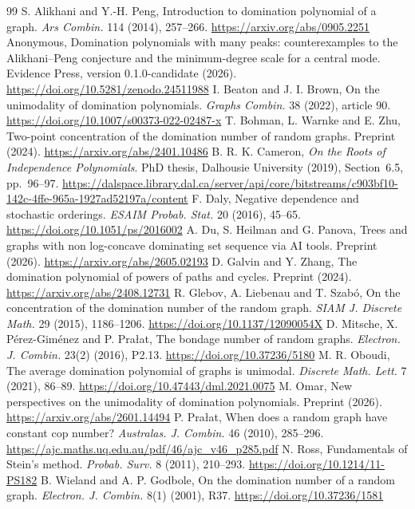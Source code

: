 \documentclass[11pt]{article}
\theoremstyle{remark}
\begin{document}
\begin{thebibliography}{99}
 S. Alikhani and Y.-H. Peng, Introduction to domination polynomial of a graph. \emph{Ars Combin.} 114 (2014), 257--266. \url{https://arxiv.org/abs/0905.2251}
 Anonymous, Domination polynomials with many peaks: counterexamples to the Alikhani--Peng conjecture and the minimum-degree scale for a central mode. Evidence Press, version 0.1.0-candidate (2026). \url{https://doi.org/10.5281/zenodo.24511988}
 I. Beaton and J. I. Brown, On the unimodality of domination polynomials. \emph{Graphs Combin.} 38 (2022), article 90. \url{https://doi.org/10.1007/s00373-022-02487-x}
 T. Bohman, L. Warnke and E. Zhu, Two-point concentration of the domination number of random graphs. Preprint (2024). \url{https://arxiv.org/abs/2401.10486}
 B. R. K. Cameron, \emph{On the Roots of Independence Polynomials}. PhD thesis, Dalhousie University (2019), Section~6.5, pp.~96--97. \url{https://dalspace.library.dal.ca/server/api/core/bitstreams/c903bf10-142c-4ffe-965a-1927ad52197a/content}
 F. Daly, Negative dependence and stochastic orderings. \emph{ESAIM Probab. Stat.} 20 (2016), 45--65. \url{https://doi.org/10.1051/ps/2016002}
 A. Du, S. Heilman and G. Panova, Trees and graphs with non log-concave dominating set sequence via AI tools. Preprint (2026). \url{https://arxiv.org/abs/2605.02193}
 D. Galvin and Y. Zhang, The domination polynomial of powers of paths and cycles. Preprint (2024). \url{https://arxiv.org/abs/2408.12731}
 R. Glebov, A. Liebenau and T. Szab\'o, On the concentration of the domination number of the random graph. \emph{SIAM J. Discrete Math.} 29 (2015), 1186--1206. \url{https://doi.org/10.1137/12090054X}
 D. Mitsche, X. P\'erez-Gim\'enez and P. Pra{\l}at, The bondage number of random graphs. \emph{Electron. J. Combin.} 23(2) (2016), P2.13. \url{https://doi.org/10.37236/5180}
 M. R. Oboudi, The average domination polynomial of graphs is unimodal. \emph{Discrete Math. Lett.} 7 (2021), 86--89. \url{https://doi.org/10.47443/dml.2021.0075}
 M. Omar, New perspectives on the unimodality of domination polynomials. Preprint (2026). \url{https://arxiv.org/abs/2601.14494}
 P. Pra{\l}at, When does a random graph have constant cop number? \emph{Australas. J. Combin.} 46 (2010), 285--296. \url{https://ajc.maths.uq.edu.au/pdf/46/ajc_v46_p285.pdf}
 N. Ross, Fundamentals of Stein's method. \emph{Probab. Surv.} 8 (2011), 210--293. \url{https://doi.org/10.1214/11-PS182}
 B. Wieland and A. P. Godbole, On the domination number of a random graph. \emph{Electron. J. Combin.} 8(1) (2001), R37. \url{https://doi.org/10.37236/1581}
\end{thebibliography}
\end{document}
